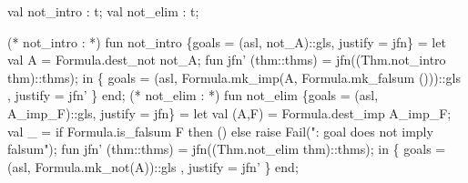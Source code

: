 \nwenddocs{}\plusendmoddef\nwstartdeflinemarkup{}\nwenddeflinemarkup
val not_intro : t;
val not_elim : t;
\nwendcode{}\nwdocspar

\nwenddocs{}\plusendmoddef\nwstartdeflinemarkup{}\nwenddeflinemarkup
(* not_intro :  *)
fun not_intro \{goals = (asl, not_A)::gls, justify = jfn\} =
  let
    val A = Formula.dest_not not_A;
    fun jfn' (thm::thms) = jfn((Thm.not_intro thm)::thms);
  in
    \{ goals = (asl, Formula.mk_imp(A, Formula.mk_falsum ()))::gls
    , justify = jfn' \}
  end;
(* not_elim :  *)
fun not_elim \{goals = (asl, A_imp_F)::gls, justify = jfn\} =
  let
    val (A,F) = Formula.dest_imp A_imp_F;
    val _ = if Formula.is_falsum F
            then ()
            else raise Fail(": goal does not imply falsum");
    fun jfn' (thm::thms) = jfn((Thm.not_elim thm)::thms);
  in
    \{ goals = (asl, Formula.mk_not(A))::gls
    , justify = jfn' \}
  end;
\eatline
